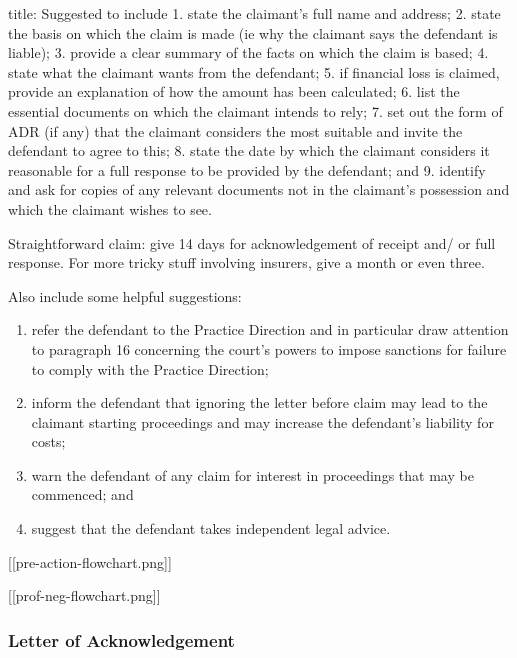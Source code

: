 \documentclass[
]{article}
\newenvironment{Shaded}{}{}
\newcommand{\NormalTok}[1]{#1}
\providecommand{\tightlist}{%
  \setlength{\itemsep}{0pt}\setlength{\parskip}{0pt}}
\begin{document}
\begin{Shaded}
\begin{Highlighting}[]
\NormalTok{title: Suggested to include}
\NormalTok{1. state the claimant’s full name and address;}
\NormalTok{2. state the basis on which the claim is made (ie why the claimant says the defendant is liable);}
\NormalTok{3. provide a clear summary of the facts on which the claim is based;}
\NormalTok{4. state what the claimant wants from the defendant;}
\NormalTok{5. if financial loss is claimed, provide an explanation of how the amount has been calculated;}
\NormalTok{6. list the essential documents on which the claimant intends to rely;}
\NormalTok{7. set out the form of ADR (if any) that the claimant considers the most suitable and invite the defendant to agree to this;}
\NormalTok{8. state the date by which the claimant considers it reasonable for a full response to be provided by the defendant; and}
\NormalTok{9. identify and ask for copies of any relevant documents not in the claimant’s possession and which the claimant wishes to see.}
\end{Highlighting}
\end{Shaded}

Straightforward claim: give 14 days for acknowledgement of receipt and/
or full response. For more tricky stuff involving insurers, give a month
or even three.

Also include some helpful suggestions:

\begin{enumerate}
\def\labelenumi{\arabic{enumi}.}
\tightlist
\item
  refer the defendant to the Practice Direction and in particular draw
  attention to paragraph 16 concerning the court's powers to impose
  sanctions for failure to comply with the Practice Direction;
\item
  inform the defendant that ignoring the letter before claim may lead to
  the claimant starting proceedings and may increase the defendant's
  liability for costs;
\item
  warn the defendant of any claim for interest in proceedings that may
  be commenced; and
\item
  suggest that the defendant takes independent legal advice.
\end{enumerate}

{[}{[}pre-action-flowchart.png{]}{]}

{[}{[}prof-neg-flowchart.png{]}{]}

\hypertarget{letter-of-acknowledgement}{%
\subsubsection{Letter of
Acknowledgement}\label{letter-of-acknowledgement}}
\end{document}
